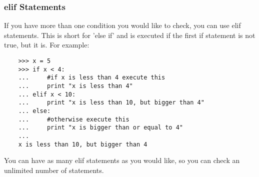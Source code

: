 \subsubsection{elif Statements}

If you have more than one condition you would like to check, you can use elif
statements. This is short for 'else if' and is executed if the first if
statement is not true, but it is. For example:

\begin{lstlisting}
    >>> x = 5
    >>> if x < 4:
    ...     #if x is less than 4 execute this
    ...     print "x is less than 4"
    ... elif x < 10:
    ...     print "x is less than 10, but bigger than 4"
    ... else:
    ...     #otherwise execute this
    ...     print "x is bigger than or equal to 4"
    ...
    x is less than 10, but bigger than 4
\end{lstlisting}

You can have as many elif statements as you would like, so you can check an
unlimited number of statements.


